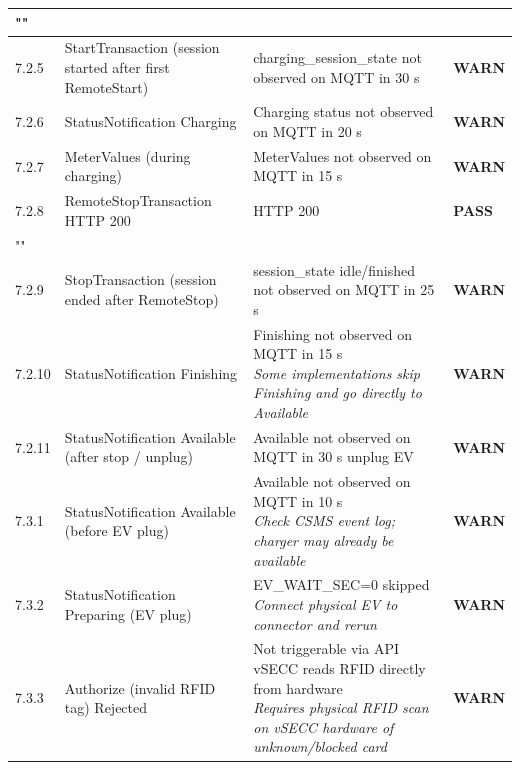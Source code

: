 \documentclass[10pt, a4paper]{article}
\begin{document}
\begin{longtable}{|L{1cm}|L{5.5cm}|M{7cm}|C{1.8cm}|}
\hline
{} \\
\hline
\small 7.2.5 & \small StartTransaction (session started after first RemoteStart) & charging\_session\_state not observed on MQTT in 30 s & \textcolor{warnorange}{\textbf{WARN}} \\
\hline
\small 7.2.6 & \small StatusNotification Charging & Charging status not observed on MQTT in 20 s & \textcolor{warnorange}{\textbf{WARN}} \\
\hline
\small 7.2.7 & \small MeterValues (during charging) & MeterValues not observed on MQTT in 15 s & \textcolor{warnorange}{\textbf{WARN}} \\
\hline
\small 7.2.8 & \small RemoteStopTransaction  HTTP 200 & HTTP 200 & \textcolor{passgreen}{\textbf{PASS}} \\
\hline
{} \\
\hline
\small 7.2.9 & \small StopTransaction (session ended after RemoteStop) & session\_state idle/finished not observed on MQTT in 25 s & \textcolor{warnorange}{\textbf{WARN}} \\
\hline
\small 7.2.10 & \small StatusNotification Finishing & Finishing not observed on MQTT in 15 s{\newline\normalfont\footnotesize\itshape Some implementations skip Finishing and go directly to Available} & \textcolor{warnorange}{\textbf{WARN}} \\
\hline
\small 7.2.11 & \small StatusNotification Available (after stop / unplug) & Available not observed on MQTT in 30 s  unplug EV & \textcolor{warnorange}{\textbf{WARN}} \\
\hline
\small 7.3.1 & \small StatusNotification Available (before EV plug) & Available not observed on MQTT in 10 s{\newline\normalfont\footnotesize\itshape Check CSMS event log; charger may already be available} & \textcolor{warnorange}{\textbf{WARN}} \\
\hline
\small 7.3.2 & \small StatusNotification Preparing (EV plug) & EV\_WAIT\_SEC=0  skipped{\newline\normalfont\footnotesize\itshape Connect physical EV to connector and rerun} & \textcolor{warnorange}{\textbf{WARN}} \\
\hline
\small 7.3.3 & \small Authorize (invalid RFID tag)  Rejected & Not triggerable via API  vSECC reads RFID directly from hardware{\newline\normalfont\footnotesize\itshape Requires physical RFID scan on vSECC hardware of unknown/blocked card} & \textcolor{warnorange}{\textbf{WARN}} \\

\end{longtable}
\end{document}
